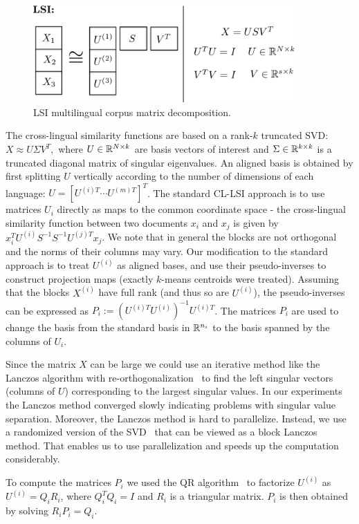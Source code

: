 \begin{figure}[tbp]
\centering
\includegraphics[width=10cm]{figures/lsi.pdf}
\caption{LSI multilingual corpus matrix decomposition.}
\label{fig:lsi}
\end{figure}

The cross-lingual similarity functions are based on a rank-$k$ truncated SVD:
$X \approx U \Sigma V^T,$ where $U \in \mathbb{R}^{N \times k}$ are basis vectors of
interest and $\Sigma \in \mathbb{R}^{k \times k}$ is a truncated diagonal matrix of singular
eigenvalues. An aligned basis is obtained by first splitting $U$ vertically according
to the number of dimensions of each language: $U = [U^{(i)T} \cdots U^{(m)T}]^T$.
The standard CL-LSI approach is to use matrices $U_i$ directly as maps to the common
coordinate space - the cross-lingual similarity function between two documents $x_i$ and
$x_j$ is given by $x_i^T U^{(i)} S^{-1} S^{-1} U^{(j)T} x_j$. We note that in general the blocks
are not orthogonal and the norms of their columns may vary. Our modification to the
standard approach is to treat $U^{(i)}$ as aligned bases, and use their pseudo-inverses
to construct projection maps (exactly $k$-means centroids were treated). Assuming
that the blocks $X^{(i)}$ have full rank (and thus so are $U^{(i)}$),
the pseudo-inverses can be expressed as $P_i := (U^{(i)T} U^{(i)})^{-1} U^{(i)T}$.
The matrices $P_i$ are used to change the basis from the standard basis in $\mathbb{R}^{n_i}$ to the
basis spanned by the columns of $U_i$.

Since the matrix $X$ can be large we could use an iterative method like the Lanczos
algorithm with re-orthogonalization~\cite{golub} to find the left singular vectors
(columns of $U$) corresponding to the largest singular values. In our experiments
the Lanczos method converged slowly indicating problems with singular value separation.
Moreover, the Lanczos method is hard to parallelize. Instead, we use a randomized version
of the SVD~\cite{tropp} that can be viewed as a block Lanczos method. That enables us
to use parallelization and speeds up the computation considerably.

To compute the matrices $P_i$ we used the QR algorithm~\cite{golub} to factorize
$U^{(i)}$ as $U^{(i)} = Q_i R_i$, where $Q_i^TQ_i = I$ and $R_i$ is a triangular matrix.
$P_i$ is then obtained by solving $R_i P_i = Q_i$.

